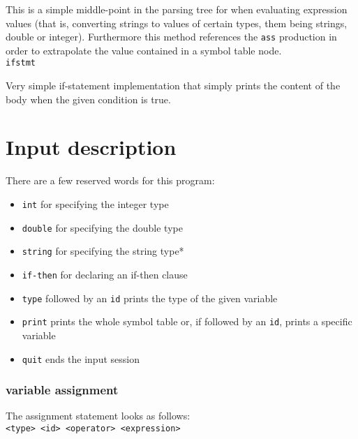 \documentclass{article}
\begin{document}
This is a simple middle-point in the parsing tree for when evaluating expression values (that is, converting strings to values of certain types, them being strings, double or integer). Furthermore this method references the \verb|ass| production in order to extrapolate the value contained in a symbol table node.\\

\verb|ifstmt|

Very simple if-statement implementation that simply prints the content of the body when the given condition is true.
\section*{Input description}
There are a few reserved words for this program:
\begin{itemize}
    \item \verb|int| for specifying the integer type
    \item \verb|double| for specifying the double type
    \item \verb|string| for specifying the string type*
    \item \verb|if-then| for declaring an if-then clause
    \item \verb|type| followed by an \verb|id| prints the type of the given variable
    \item \verb|print| prints the whole symbol table or, if followed by an \verb|id|, prints a specific variable
    \item \verb|quit| ends the input session
\end{itemize}
\subsubsection*{variable assignment}
The assignment statement looks as follows:\\

\verb|<type> <id> <operator> <expression>|\\
\end{document}
